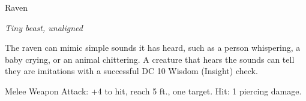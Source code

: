 \begin{monsterbox}{Raven}
\begin{hangingpar}
\textit{Tiny beast, unaligned}
\end{hangingpar}
\dndline%
\basics[%
armorclass = 12,
hitpoints = 1d4 - 1,
speed = {10 ft., fly 50 ft.}
]
\dndline%
\stats[%
STR = \stat{2},
DEX = \stat{14},
CON = \stat{8},
INT = \stat{2},
WIS = \stat{12},
CHA = \stat{6}
]
\dndline%
\details[%
skills={Perception +3, },
damageimmunities={},
savingthrows={},
conditionimmunities={},
damageresistances={},
damagevulnerabilities={},
senses={passive Perception 13},
challenge=0
]
\dndline%
\begin{monsteraction}[Mimicry]
The raven can mimic simple sounds it has heard, such as a person whispering, a baby crying, or an animal chittering. A creature that hears the sounds can tell they are imitations with a successful DC 10 Wisdom (Insight) check.
\end{monsteraction}
\begin{monsteraction}[Beak]
Melee Weapon Attack: +4 to hit, reach 5 ft., one target. Hit: 1 piercing damage.
\end{monsteraction}
\end{monsterbox}
